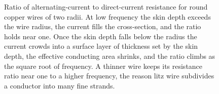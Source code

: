 \begin{figure}[htbp]
\centering
{}
\caption[AC-to-DC resistance ratio of a round wire against
frequency]{Ratio of alternating-current to direct-current resistance
for round copper wires of two radii. At low frequency the skin depth
exceeds the wire radius, the current fills the cross-section, and the
ratio holds near one. Once the skin depth falls below the radius the
current crowds into a surface layer of thickness set by the skin depth,
the effective conducting area shrinks, and the ratio climbs as the
square root of frequency. A thinner wire keeps its resistance ratio near
one to a higher frequency, the reason litz wire subdivides a conductor
into many fine strands.}
\label{fig:vol04ch10:skin-effect-resistance}
\end{figure}
